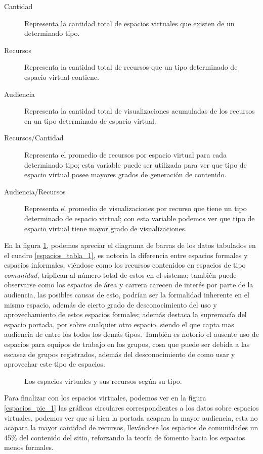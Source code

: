 \begin{description}
\item [Cantidad] Representa la cantidad total de espacios virtuales que existen
de un determinado tipo.
\item [Recursos] Representa la cantidad total de recursos que un tipo
determinado de espacio virtual contiene.
\item [Audiencia] Representa la cantidad total de visualizaciones acumuladas de
los recursos en un tipo determinado de espacio virtual.
\item [Recursos/Cantidad] Representa el promedio de recursos por espacio virtual
para cada determinado tipo; esta variable puede ser utilizada para ver que tipo
de espacio virtual posee mayores grados de generación de contenido.
\item [Audiencia/Recursos] Representa el promedio de visualizaciones por recurso
que tiene un tipo determinado de espacio virtual; con esta variable podemos ver
que tipo de espacio virtual tiene mayor grado de visualizaciones.
\end{description}

En la figura \ref{espacios_bars_1}, podemos apreciar el diagrama de barras de
los datos tabulados en el cuadro \ref{espacios_tabla_1}, es notoria la
diferencia entre espacios formales y espacios informales, viéndose como los
recursos contenidos en espacios de tipo \emph{comunidad}, triplican al número
total de estos en el sistema; también puede observarse como los espacios de área
y carrera carecen de interés por parte de la audiencia, las posibles causas de
esto, podrían ser la formalidad inherente en el mismo espacio, además de cierto
grado de desconocimiento del uso y aprovechamiento de estos espacios formales;
además destaca la supremacía del espacio portada, por sobre cualquier otro
espacio, siendo el que capta mas audiencia de entre los todos los demás tipos.
También es notorio el ausente uso de espacios para equipos de trabajo en los
grupos, cosa que puede ser debida a las escasez de grupos registrados, además
del desconocimiento de como usar y aprovechar este tipo de espacios.

\begin{figure}
\centering

\caption{Los espacios virtuales y sus recursos según su tipo.}
\label{espacios_bars_1}
\end{figure}

Para finalizar con los espacios virtuales, podemos ver en la figura
\ref{espacios_pie_1} las gráficas circulares correspondientes a los datos sobre
espacios virtuales, podemos ver que si bien la portada acapara la mayor
audiencia, esta no acapara la mayor cantidad de recursos, llevándose los
espacios de comunidades un 45\% del contenido del sitio, reforzando la teoría de
fomento hacia los espacios menos formales.

